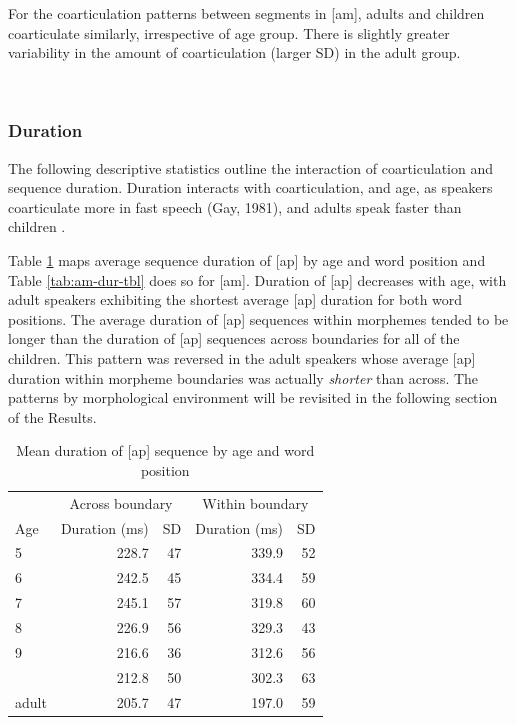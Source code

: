 \documentclass[a4paper,man,floatsintext,natbib,donotrepeattitle, apacite]{apa6}
\begin{document}
For the coarticulation patterns between segments in {[}am{]}, adults and children coarticulate similarly, irrespective of age group. There is slightly greater variability in the amount of coarticulation (larger SD) in the adult group.


~
~

\subsubsection{Duration}\label{duration}

The following descriptive statistics outline the interaction of coarticulation and sequence duration. Duration interacts with coarticulation, and age, as speakers coarticulate more in fast speech (Gay, 1981), and adults speak faster than children \citep{leeAcousticsChildrenSpeech1999}.

Table \ref{tab:ap-dur-tbl} maps average sequence duration of {[}ap{]} by age and word position and Table \ref{tab:am-dur-tbl} does so for {[}am{]}. Duration of {[}ap{]} decreases with age, with adult speakers exhibiting the shortest average {[}ap{]} duration for both word positions. The average duration of {[}ap{]} sequences within morphemes tended to be longer than the duration of {[}ap{]} sequences across boundaries for all of the children. This pattern was reversed in the adult speakers whose average {[}ap{]} duration within morpheme boundaries was actually \emph{shorter} than across. The patterns by morphological environment will be revisited in the following section of the Results.

\begin{table}[H]

\caption{\label{tab:ap-dur-tbl}Mean duration of [ap] sequence by age and word position}
\centering
\begin{tabular}[t]{lrrrr}
\toprule
\multicolumn{1}{c}{ } & \multicolumn{2}{c}{Across boundary} & \multicolumn{2}{c}{Within boundary} \\
\cmidrule(l{3pt}r{3pt}){2-3} \cmidrule(l{3pt}r{3pt}){4-5}
Age & Duration (ms) & SD  & Duration (ms) & SD\\
\midrule
5 & 228.7 & 47 & 339.9 & 52\\
6 & 242.5 & 45 & 334.4 & 59\\
7 & 245.1 & 57 & 319.8 & 60\\
8 & 226.9 & 56 & 329.3 & 43\\
9 & 216.6 & 36 & 312.6 & 56\\
\addlinespace
10 & 212.8 & 50 & 302.3 & 63\\
adult & 205.7 & 47 & 197.0 & 59\\
\bottomrule
\end{tabular}
\end{table}
\end{document}
